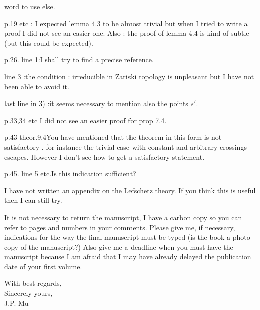word to use else.

\margin{!}\uline{p.19 etc} : I expected lemma 4.3 to be almost trivial but when I tried to write a proof I did not see an easier one. Also : the proof of lemma 4.4 is kind of subtle (but this could be expected).

p.26. line 1:\quad I shall try to find a precise reference.

line 3 :\quad the condition : irreducible in \uline{Zariski topology} is unpleasant but I have not been able to avoid it.

last line in 3) :\quad it seems necessary to mention also the points $s'$.

p.33,34 etc \quad I did not see an easier proof for prop 7.4.

p.43 theor.9.4\quad You have mentioned that the theorem in this form is not satisfactory . for instance the trivial case with constant  and arbitrary crossings escapes. However I don't see how to get a satisfactory statement.

p.45. line 5 etc.\quad Is this indication sufficient?

I have not written an appendix on the Lefschetz theory. If you think this is useful then I can still try.

It is not necessary to return the manuscript, I have a carbon copy so you can refer to pages and numbers in your comments. Please give me, if necessary, indications for the way the final manuscript must be typed (is the book a  photo copy of the manuscript?) Also give me a deadline when you must have the manuscript because I am afraid that I may have already delayed the publication date of your first volume.

With best regards,\\
Sincerely yours,\\
J.P. Mu\\
